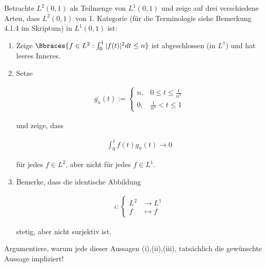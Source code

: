 \begin{exercise}

Betrachte $L^2(0, 1)$ als Teilmenge von $L^1(0, 1)$ und zeige auf drei verschiedene Arten, dass $L^2(0, 1)$ von 1. Kategorie (für die Terminologie siehe Bemerkung 4.1.4 im Skriptum) in $L^1(0,1)$ ist:

\begin{enumerate}[label = (\roman*)]

  \item
  Zeige $\Bbraces{f \in L^2: \int_0^1 |f(t)|^2 dt \leq n}$ ist abgeschlossen (in $L^1$) und hat leeres Inneres.

  \item
  Setze

  \begin{align*}
    g_n(t)
    :=
    \begin{cases}
      n, & 0 \leq t \leq \frac{1}{n^3} \\
      0, & \frac{1}{n^3} < t \leq 1
    \end{cases}
  \end{align*}

  und zeige, dass

  \begin{align*}
    \int_0^1 f(t)g_n(t) \rightarrow 0
  \end{align*}

  für jedes $f \in L^2$, aber nicht für jedes $f \in L^1$.

  \item
  Bemerke, dass die identische Abbildung

  \begin{align*}
    \iota:
    \begin{cases}
      L^2 &\rightarrow L^1 \\
      f &\mapsto f
    \end{cases}
  \end{align*}

  stetig, aber nicht surjektiv ist.

\end{enumerate}

Argumentiere, warum jede dieser Aussagen (i),(ii),(iii), tatsächlich die gewünschte Aussage impliziert!

\end{exercise}

